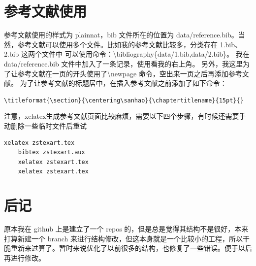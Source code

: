 \documentclass[a4paper,12pt]{ctexart}
\begin{document}
\section{参考文献使用}
参考文献使用的样式为 plainnat，bib 文件所在的位置为 data/reference.bib。当然，参考文献可以使用多个文件。比如我的参考文献比较多，分类存在 1.bib、2.bib 这两个文件中
可以使用命令：\textbackslash{}bibliography\{data/1.bib,data/2.bib\}。
我在 data/reference.bib 文件中加入了一条记录，使用看我的右上角\cite{刘海洋2013latex}。
另外，我这里为了让参考文献在一页的开头使用了\textbackslash{}newpage 命令，空出来一页之后再添加参考文献。
为了让参考文献的标题居中，在插入参考文献之前添加了如下命令：

\verb|\titleformat{\section}{\centering\sanhao}{\chaptertitlename}{15pt}{}|

注意，xelatex生成参考文献页面比较麻烦，需要以下四个步骤，有时候还需要手动删除一些临时文件后重试

\begin{lstlisting}[language=bash]
    xelatex zstexart.tex
    bibtex zstexart.aux
    xelatex zstexart.tex
    xelatex zstexart.tex
\end{lstlisting}

\section{后记}
原本我在 github 上是建立了一个 repos 的，但是总是觉得其结构不是很好，本来打算新建一个 branch 来进行结构修改，但这本身就是一个比较小的工程，所以干脆重新来过算了。暂时来说优化了以前很多的结构，也修复了一些错误。便于以后再进行修改。

\newpage
\titleformat{\section}{\centering\sanhao}{\chaptertitlename}{15pt}{}


\end{document}
